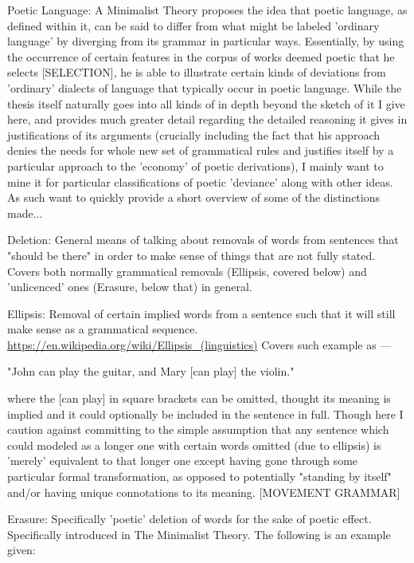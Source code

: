 \documentclass[]{article}
\begin{document}
Poetic Language: A Minimalist Theory proposes the idea that poetic language, as defined within it, can be said to differ from what might be labeled 'ordinary language' by diverging from its grammar in particular ways. Essentially, by using the occurrence of certain features in the corpus of works deemed poetic that he selects [SELECTION], he is able to illustrate certain kinds of deviations from 'ordinary' dialects of language that typically occur in poetic language. While the thesis itself naturally goes into all kinds of in depth beyond the sketch of it I give here, and provides much greater detail regarding the detailed reasoning it gives in justifications of its arguments (crucially including the fact that his approach denies the needs for whole new set of grammatical rules and justifies itself by a particular approach to the 'economy' of poetic derivations), I mainly want to mine it for particular classifications of poetic 'deviance' along with other ideas. As such want to quickly provide a short overview of some of the distinctions made...



Deletion: General means of talking about removals of words from sentences that "should be there" in order to make sense of things that are not fully stated. Covers both normally grammatical removals (Ellipsis, covered below) and 'unlicenced' ones (Erasure, below that) in general.



Ellipsis: Removal of certain implied words from a sentence such that it will still make sense as a grammatical sequence. \url{https://en.wikipedia.org/wiki/Ellipsis_(linguistics)} Covers such example as —

"John can play the guitar, and Mary [can play] the violin."

where the [can play] in square brackets can be omitted, thought its meaning is implied and it could optionally be included in the sentence in full. Though here I caution against committing to the simple assumption that any sentence which could modeled as a longer one with certain words omitted (due to ellipsis) is 'merely' equivalent to that longer one except having gone through some particular formal transformation, as opposed to potentially "standing by itself" and/or having unique connotations to its meaning. [MOVEMENT GRAMMAR]



Erasure: Specifically 'poetic' deletion of words for the sake of poetic effect. Specifically introduced in The Minimalist Theory. The following is an example given:
\end{document}
